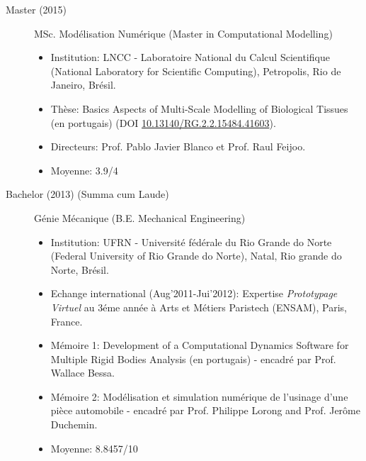 \documentclass[french]{article}
\begin{document}
\begin{description}
\begin{itemize}
\end{itemize}
\item[Master (2015)] MSc. Modélisation Numérique (Master in Computational Modelling)
\begin{itemize}
\item Institution: LNCC - Laboratoire National du Calcul Scientifique (National Laboratory for Scientific Computing),  Petropolis, Rio de Janeiro, Brésil.
\item Thèse: Basics Aspects of Multi-Scale Modelling of Biological Tissues (en portugais) (DOI \url{10.13140/RG.2.2.15484.41603}).
\item Directeurs: Prof. Pablo Javier Blanco et Prof. Raul Feijoo.
\item Moyenne: 3.9/4 
\end{itemize}

\item[Bachelor (2013) (Summa cum Laude)] Génie Mécanique (B.E. Mechanical Engineering)
\begin{itemize}
	\item Institution: UFRN - Université fédérale du Rio Grande do Norte (Federal University of Rio Grande do Norte),  Natal, Rio grande do Norte, Brésil.
	\item Echange international (Aug'2011-Jui'2012): Expertise \textit{Prototypage Virtuel} au 3éme année à Arts et Métiers Paristech (ENSAM), Paris, France.
	\item Mémoire 1: Development of a Computational Dynamics Software for Multiple Rigid Bodies Analysis (en portugais) - encadré par Prof. Wallace Bessa.
	\item Mémoire 2: Modélisation et simulation numérique de l'usinage d'une pièce automobile - encadré par Prof. Philippe Lorong and Prof. Jerôme Duchemin.
	\item Moyenne: 8.8457/10
\end{itemize}
\end{description}
\end{document}
